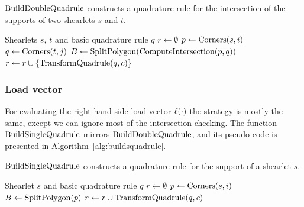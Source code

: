 \begin{algorithm}
\caption{$\operatorname{BuildDoubleQuadrule}$ constructs a quadrature rule for the intersection of the supports of two shearlets
$s$ and $t$.}
\label{alg:builddquadrule}
\begin{algorithmic}[1]
\REQUIRE Shearlets $s$, $t$ and basic quadrature rule $q$
\STATE $r\leftarrow \emptyset$
\STATE $p\leftarrow\operatorname{Corners}(s,i)$
\STATE $q\leftarrow\operatorname{Corners}(t,j)$
\STATE $B\leftarrow\operatorname{SplitPolygon}(\operatorname{ComputeIntersection}(p,q))$
\STATE $r\leftarrow r\cup\left\{\operatorname{TransformQuadrule}(q,c)\right\}$
\ENDFOR
\ENDFOR
\end{algorithmic}
\end{algorithm}


\subsubsection{Load vector}

For evaluating the right hand side load vector ${\ell}(\cdot)$ the strategy is mostly the same, except we can
ignore most of the intersection checking. The function $\operatorname{BuildSingleQuadrule}$ mirrors $\operatorname{BuildDoubleQuadrule}$, and its
pseudo-code is presented in Algorithm~\ref{alg:buildsquadrule}.

\begin{algorithm}
\caption{$\operatorname{BuildSingleQuadrule}$ constructs a quadrature rule for the support of a shearlet $s$.}
\label{alg:buildsquadrule}
\begin{algorithmic}[1]
\REQUIRE Shearlet $s$ and basic quadrature rule $q$
\STATE $r\leftarrow \emptyset$
\STATE $p\leftarrow\operatorname{Corners}(s,i)$
\STATE $B\leftarrow\operatorname{SplitPolygon}(p)$
\STATE $r\leftarrow r\cup\operatorname{TransformQuadrule}(q,c)$
\ENDFOR
\ENDFOR
\end{algorithmic}
\end{algorithm}

